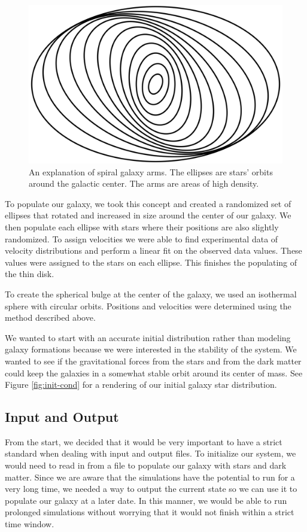 \documentclass{article}
\begin{document}
\begin{figure}
\centering
\includegraphics[width=.8\columnwidth]{spiral-arms.png}
\caption{An explanation of spiral galaxy arms.  The ellipses are stars' orbits around the galactic center.  The arms are areas of high density. \label{fig:spiral-arms}}
\end{figure}

To populate our galaxy, we took this concept and created a randomized set of ellipses that rotated and increased in size around the center of our galaxy.  We then populate each ellipse with stars where their positions are also slightly randomized.  To assign velocities we were able to find experimental data of velocity distributions \cite{velocity-distributions} and perform a linear fit on the observed data values.  These values were assigned to the stars on each ellipse. This finishes the populating of the thin disk.

To create the spherical bulge at the center of the galaxy, we used an isothermal sphere with circular orbits.  Positions and velocities were determined using the method described above.

We wanted to start with an accurate initial distribution rather than modeling galaxy formations because we were interested in the stability of the system.  We wanted to see if the gravitational forces from the stars and from the dark matter could keep the galaxies in a somewhat stable orbit around its center of mass.  See Figure \ref{fig:init-cond} for a rendering of our initial galaxy star distribution.

\subsection{Input and Output}
\label{subsec:io}

From the start, we decided that it would be very important to have a strict standard when dealing with input and output files.  To initialize our system, we would need to read in from a file to populate our galaxy with stars and dark matter.  Since we are aware that the simulations have the potential to run for a very long time, we needed a way to output the current state so we can use it to populate our galaxy at a later date.  In this manner, we would be able to run prolonged simulations without worrying that it would not finish within a strict time window.  
\end{document}
